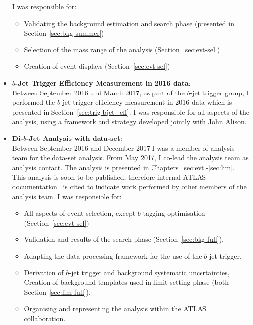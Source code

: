 \begin{itemize}[leftmargin=*]
  I was responsible for:
  \begin{itemize}
    \item Validating the background estimation and search phase (presented in Section~\ref{sec:bkg-summer})
    \item Selection of the mass range of the analysis (Section~\ref{sec:evt-sel})
    \item Creation of event displays (Section~\ref{sec:evt-sel})
  \end{itemize}
  \vspace{1em}
\item\textbf{$b$-Jet Trigger Efficiency Measurement in 2016 data}:\\
  Between September 2016 and March 2017, as part of the $b$-jet trigger group,
  I performed the $b$-jet trigger efficiency measurement in 2016 data which is presented in Section~\ref{sec:trig-bjet_eff}.
  I was responsible for all aspects of the analysis, using a framework and strategy developed jointly with John Alison.
  \vspace{1em}
\item\textbf{Di-$b$-Jet Analysis  with \lm{} data-set}:\\ 
  Between September 2016 and December 2017 I was a member of analysis team for the \lm{} data-set analysis.
  From May 2017, I co-lead the analysis team as analysis contact.
  The analysis is presented in Chapters~\ref{sec:evt}-\ref{sec:lim}.
  This analysis is soon to be published; therefore internal ATLAS documentation~\cite{dibjet-full_int} is cited to indicate work performed by other members of the analysis team.
  I was responsible for:
  \begin{itemize}
    \item All aspects of event selection, except $b$-tagging optimisation (Section~\ref{sec:evt-sel})
    \item Validation and results of the search phase (Section~\ref{sec:bkg-full}).
    \item Adapting the data processing framework for the use of the $b$-jet trigger.
    \item Derivation of $b$-jet trigger and background systematic uncertainties,\\
      Creation of background templates used in limit-setting phase (both Section~\ref{sec:lim-full}).
    \item Organising and representing the analysis within the ATLAS collaboration.

\end{itemize}
\end{itemize}
